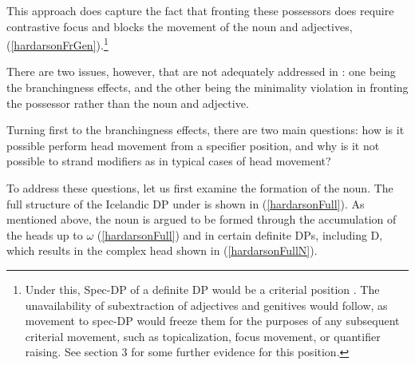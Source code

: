 \documentclass[output=paper,colorlinks,citecolor=brown,
]{langscibook}
\begin{document}
\noindent This approach does capture the fact that fronting these possessors does require contrastive focus and blocks the movement of the noun and adjectives, (\ref{hardarsonFrGen}).\footnote{Under this, Spec-DP of a definite DP would be a criterial position \citep[cf.][]{Rizzi:2006ti,Boskovic:2008wp,wurmbrand2014gisli,wurmbrand2015}. The unavailability of subextraction of adjectives and genitives would follow, as movement to spec-DP would freeze them for the purposes of any subsequent criterial movement, such as topicalization, focus movement, or quantifier raising. See section 3 for some further evidence for this position.}

\begin{exe}
\ex	\label{hardarsonFrGen}
	\begin{xlist}
	\setlength{\columnsep}{20pt}
	\begin{multicols}{2}
	\end{multicols}
	\end{xlist}
\end{exe}

There are two issues, however, that are not adequately addressed in \cite{Hardarson:2016wd}: one being the branchingness effects, and the other being the minimality violation in fronting the possessor rather than the noun and adjective.

Turning first to the branchingness effects, there are two main questions: how is it possible perform head movement from a specifier position, and why is it not possible to strand modifiers as in typical cases of head movement?

To address these questions, let us first examine the formation of the noun. The full structure of the Icelandic DP under \cite{Hardarson:2016wd} is shown in (\ref{hardarsonFull}). As mentioned above, the noun is argued to be formed through the accumulation of the heads up to $\omega$ (\ref{hardarsonFull}) and in certain definite DPs, including D, which results in the complex head shown in (\ref{hardarsonFullN}).
\end{document}
